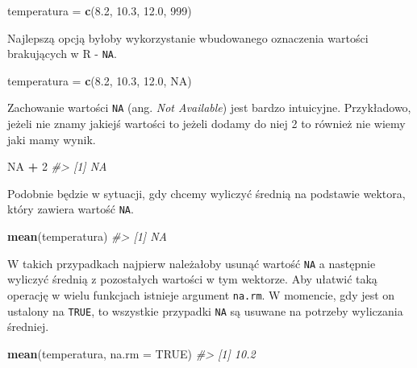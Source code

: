 \documentclass[paper=6in:9in,pagesize=pdftex,headinclude=on,footinclude=on,10pt]{scrbook}
\newenvironment{Shaded}{\begin{snugshade}}{\end{snugshade}}
\newcommand{\CommentTok}[1]{\textcolor[rgb]{0.56,0.35,0.01}{\textit{#1}}}
\newcommand{\DataTypeTok}[1]{\textcolor[rgb]{0.13,0.29,0.53}{#1}}
\newcommand{\DecValTok}[1]{\textcolor[rgb]{0.00,0.00,0.81}{#1}}
\newcommand{\FloatTok}[1]{\textcolor[rgb]{0.00,0.00,0.81}{#1}}
\newcommand{\KeywordTok}[1]{\textcolor[rgb]{0.13,0.29,0.53}{\textbf{#1}}}
\newcommand{\NormalTok}[1]{#1}
\newcommand{\OperatorTok}[1]{\textcolor[rgb]{0.81,0.36,0.00}{\textbf{#1}}}
\newcommand{\OtherTok}[1]{\textcolor[rgb]{0.56,0.35,0.01}{#1}}
\newcommand{\StringTok}[1]{\textcolor[rgb]{0.31,0.60,0.02}{#1}}
\begin{document}
\begin{Shaded}
\begin{Highlighting}[]
\NormalTok{temperatura =}\StringTok{ }\KeywordTok{c}\NormalTok{(}\FloatTok{8.2}\NormalTok{, }\FloatTok{10.3}\NormalTok{, }\FloatTok{12.0}\NormalTok{, }\DecValTok{999}\NormalTok{)}
\end{Highlighting}
\end{Shaded}

Najlepszą opcją byłoby wykorzystanie wbudowanego oznaczenia wartości brakujących w R - \texttt{NA}.

\begin{Shaded}
\begin{Highlighting}[]
\NormalTok{temperatura =}\StringTok{ }\KeywordTok{c}\NormalTok{(}\FloatTok{8.2}\NormalTok{, }\FloatTok{10.3}\NormalTok{, }\FloatTok{12.0}\NormalTok{, }\OtherTok{NA}\NormalTok{)}
\end{Highlighting}
\end{Shaded}

Zachowanie wartości \texttt{NA} (ang. \emph{Not Available}) jest bardzo intuicyjne.
Przykładowo, jeżeli nie znamy jakiejś wartości to jeżeli dodamy do niej 2 to również nie wiemy jaki mamy wynik.

\begin{Shaded}
\begin{Highlighting}[]
\OtherTok{NA} \OperatorTok{+}\StringTok{ }\DecValTok{2}
\CommentTok{#> [1] NA}
\end{Highlighting}
\end{Shaded}

Podobnie będzie w sytuacji, gdy chcemy wyliczyć średnią na podstawie wektora, który zawiera wartość \texttt{NA}.

\begin{Shaded}
\begin{Highlighting}[]
\KeywordTok{mean}\NormalTok{(temperatura)}
\CommentTok{#> [1] NA}
\end{Highlighting}
\end{Shaded}

W takich przypadkach najpierw należałoby usunąć wartość \texttt{NA} a następnie wyliczyć średnią z pozostałych wartości w tym wektorze.
Aby ułatwić taką operację w wielu funkcjach istnieje argument \texttt{na.rm}.
W momencie, gdy jest on ustalony na \texttt{TRUE}, to wszystkie przypadki \texttt{NA} są usuwane na potrzeby wyliczania średniej.

\begin{Shaded}
\begin{Highlighting}[]
\KeywordTok{mean}\NormalTok{(temperatura, }\DataTypeTok{na.rm =} \OtherTok{TRUE}\NormalTok{)}
\CommentTok{#> [1] 10.2}
\end{Highlighting}
\end{Shaded}
\end{document}
